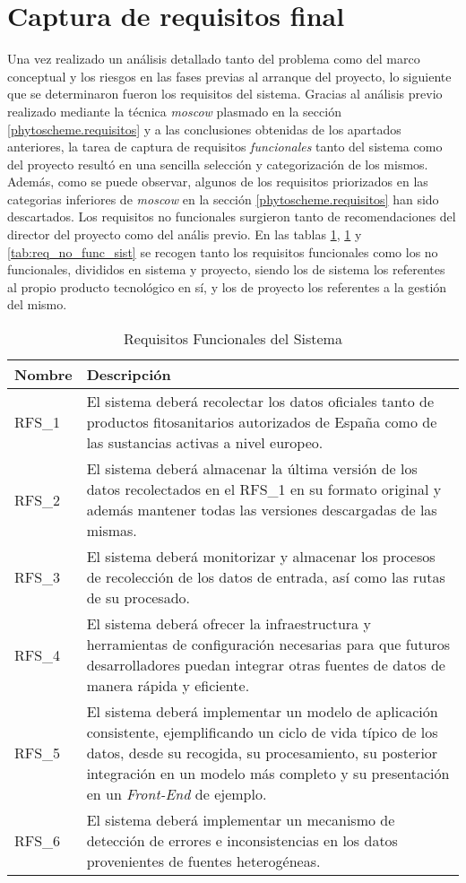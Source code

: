 \section{Captura de requisitos final}  \label{analisis.requisitos}
Una vez realizado un análisis detallado tanto del problema como del marco conceptual y los riesgos en las fases previas al arranque del proyecto, lo  siguiente que se determinaron fueron los requisitos del sistema. Gracias al análisis previo realizado mediante la técnica \textit{\gls{moscow}} plasmado en la sección \ref{phytoscheme.requisitos} y a las conclusiones obtenidas de los apartados anteriores, la tarea de captura de requisitos \textit{funcionales} tanto del sistema como del proyecto resultó en una sencilla selección y categorización de los mismos. Además, como se puede observar, algunos de los requisitos priorizados en las categorias inferiores de \textit{\gls{moscow}} en la sección \ref{phytoscheme.requisitos} han sido descartados. Los requisitos no funcionales surgieron tanto de recomendaciones del director del proyecto como del anális previo. En las tablas \ref{tab:req_func_sist}, \ref{tab:req_func_sist} y \ref{tab:req_no_func_sist} se recogen tanto los requisitos funcionales como los no funcionales, divididos en sistema y proyecto, siendo los de sistema los referentes al propio producto tecnológico en sí, y los de proyecto los referentes a la gestión del mismo. 
\par
\begin{table}[!t]
\centering
\bgroup
\def\arraystretch{1.3}
\begin{tabular}{l p{13cm}}
\toprule
\textbf{Nombre} & \textbf{Descripción} \\
 \midrule
RFS\_1 & 
El sistema deberá recolectar los datos oficiales tanto de productos fitosanitarios autorizados de España como de las sustancias activas a nivel europeo.
 \\
RFS\_2 & 
El sistema deberá almacenar la última versión de los datos recolectados en el RFS\_1 en su formato original y además mantener todas las versiones descargadas de las mismas. 
 \\
RFS\_3 & 
El sistema deberá monitorizar y almacenar los procesos de recolección de los datos de entrada, así como las rutas de su procesado. 
 \\
RFS\_4 & 
El sistema deberá ofrecer la infraestructura y herramientas de configuración necesarias para que futuros desarrolladores puedan integrar otras fuentes de datos de manera rápida y eficiente. 
 \\
RFS\_5 & 
El sistema deberá implementar un modelo de aplicación consistente, ejemplificando un ciclo de vida típico de los datos, desde su recogida, su procesamiento, su posterior integración en un modelo más completo y su presentación en un \textit{Front-End} de ejemplo.
 \\
RFS\_6 & 
El sistema deberá implementar un mecanismo de detección de errores e inconsistencias en los datos provenientes de fuentes heterogéneas.
 \\
\bottomrule
\end{tabular}
\egroup
\caption{Requisitos Funcionales del Sistema}
\label{tab:req_func_sist}
\end{table}


